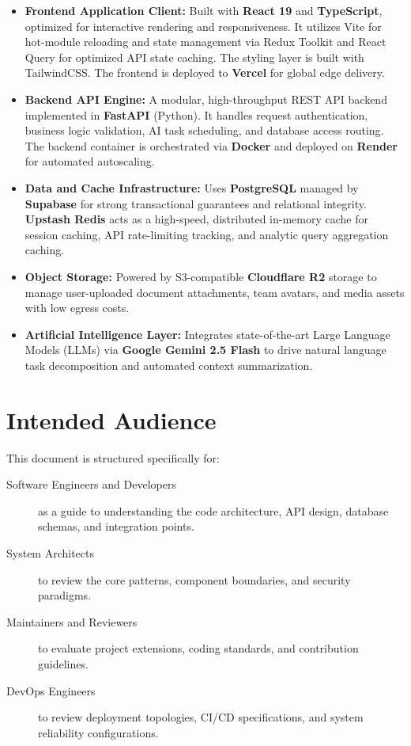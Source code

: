 \begin{itemize}
    \item \textbf{Frontend Application Client:} Built with \textbf{React 19} and \textbf{TypeScript}, optimized for interactive rendering and responsiveness. It utilizes Vite for hot-module reloading and state management via Redux Toolkit and React Query for optimized API state caching. The styling layer is built with TailwindCSS. The frontend is deployed to \textbf{Vercel} for global edge delivery.
    \item \textbf{Backend API Engine:} A modular, high-throughput REST API backend implemented in \textbf{FastAPI} (Python). It handles request authentication, business logic validation, AI task scheduling, and database access routing. The backend container is orchestrated via \textbf{Docker} and deployed on \textbf{Render} for automated autoscaling.
    \item \textbf{Data and Cache Infrastructure:} Uses \textbf{PostgreSQL} managed by \textbf{Supabase} for strong transactional guarantees and relational integrity. \textbf{Upstash Redis} acts as a high-speed, distributed in-memory cache for session caching, API rate-limiting tracking, and analytic query aggregation caching.
    \item \textbf{Object Storage:} Powered by S3-compatible \textbf{Cloudflare R2} storage to manage user-uploaded document attachments, team avatars, and media assets with low egress costs.
    \item \textbf{Artificial Intelligence Layer:} Integrates state-of-the-art Large Language Models (LLMs) via \textbf{Google Gemini 2.5 Flash} to drive natural language task decomposition and automated context summarization.
\end{itemize}

\section*{Intended Audience}
This document is structured specifically for:
\begin{description}
    \item[Software Engineers and Developers] as a guide to understanding the code architecture, API design, database schemas, and integration points.
    \item[System Architects] to review the core patterns, component boundaries, and security paradigms.
    \item[Maintainers and Reviewers] to evaluate project extensions, coding standards, and contribution guidelines.
    \item[DevOps Engineers] to review deployment topologies, CI/CD specifications, and system reliability configurations.
\end{description}


